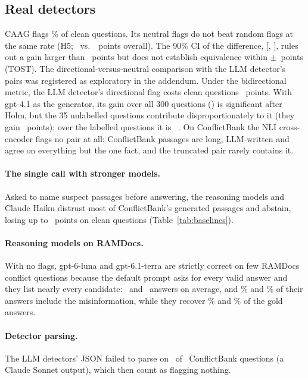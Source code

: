 \subsection{Real detectors}
CAAG flags \cleanFprCaag\% of clean questions. Its neutral flags do not beat random flags at the same rate (H5;
\dCaagFlagAll\ vs.\ \dRandFlagAll\ points overall). The 90\% CI of the difference, [\tostLo, \tostHi], rules out a
gain larger than \tostHi\ points but does not establish equivalence within $\pm$\tostMargin\ points (TOST). The
directional-versus-neutral comparison with the LLM detector's pairs was registered as exploratory in the addendum.
Under the bidirectional metric, the LLM detector's directional flag costs clean questions \arLlmDirClean\ points. With
gpt-4.1 as the generator, its gain over all 300 questions (\gptLlmDirAll) is significant after Holm, but the 35
unlabelled questions contribute disproportionately to it (they gain \agptexclLlmDir\ points); over the labelled
questions it is \gptlabLlmDir\ \gptlabLlmDirCI. On ConflictBank the NLI cross-encoder flags no pair at all:
ConflictBank passages are long, LLM-written and agree on everything but the one fact, and the truncated pair rarely
contains it.

\paragraph{The single call with stronger models.} Asked to name suspect passages before answering, the reasoning
models and Claude Haiku distrust most of ConflictBank's generated passages and abstain, losing up to
\azSgTerraSelfIdentifyClean\ points on clean questions (Table~\ref{tab:baselines}).

\paragraph{Reasoning models on RAMDocs.} With no flags, gpt-6-luna and gpt-6.1-terra are strictly correct on few
RAMDocs conflict questions because the default prompt asks for every valid answer and they list nearly every candidate:
\mixRdLunaNAnswers\ and \mixRdTerraNAnswers\ answers on average, and \mixRdLunaMisinfo\% and \mixRdTerraMisinfo\% of
their answers include the misinformation, while they recover \mixRdLunaRecall\% and \mixRdTerraRecall\% of the gold
answers.

\paragraph{Detector parsing.} The LLM detectors' JSON failed to parse on \parseFailTotal\ of \parseFailN\ ConflictBank
questions (a Claude Sonnet output), which then count as flagging nothing.

